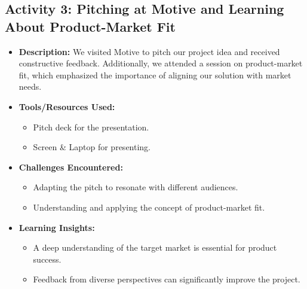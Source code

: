 \documentclass{article}
\begin{document}
\subsection*{Activity 3: Pitching at Motive and Learning About Product-Market Fit}
\begin{itemize}
    \item \textbf{Description:} We visited Motive to pitch our project idea and received constructive feedback. Additionally, we attended a session on product-market fit, which emphasized the importance of aligning our solution with market needs.
    \item \textbf{Tools/Resources Used:}
    \begin{itemize}
        \item Pitch deck for the presentation.
        \item Screen \& Laptop for presenting.
    \end{itemize}
    \item \textbf{Challenges Encountered:}
    \begin{itemize}
        \item Adapting the pitch to resonate with different audiences.
        \item Understanding and applying the concept of product-market fit.
    \end{itemize}
    \item \textbf{Learning Insights:}
    \begin{itemize}
        \item A deep understanding of the target market is essential for product success.
        \item Feedback from diverse perspectives can significantly improve the project.
    \end{itemize}
\end{itemize}
\end{document}
